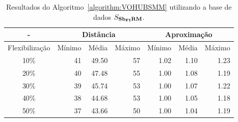 \begin{table}[!htb]
  \caption{Resultados do Algoritmo~\ref{algorithm:VOHUBSMM} utilizando a base de dados $S_{\textbf{Sb\textsubscript{FI}RM}}{}$.}
  \label{table:ZTVCHZCR}
  \centering
  \begin{tabular}{|c|r|r|r|r|r|r|}
    \hline
      -            & \multicolumn{3}{c|}{Distância}             & \multicolumn{3}{c|}{Aproximação}           \\ \hline
    Flexibilização & Mínimo       & Média        & Máximo       & Mínimo       & Média        & Máximo       \\ \hline  
    10\%           & 41           & 49.50        & 57           & 1.02         & 1.10         & 1.23         \\ \hline
    20\%           & 40           & 47.48        & 55           & 1.00         & 1.08         & 1.19         \\ \hline
    30\%           & 39           & 45.74        & 53           & 1.00         & 1.07         & 1.22         \\ \hline
    40\%           & 38           & 44.68        & 53           & 1.00         & 1.05         & 1.18         \\ \hline
    50\%           & 37           & 43.66        & 50           & 1.00         & 1.04         & 1.19         \\ \hline    
  \end{tabular}
\end{table}